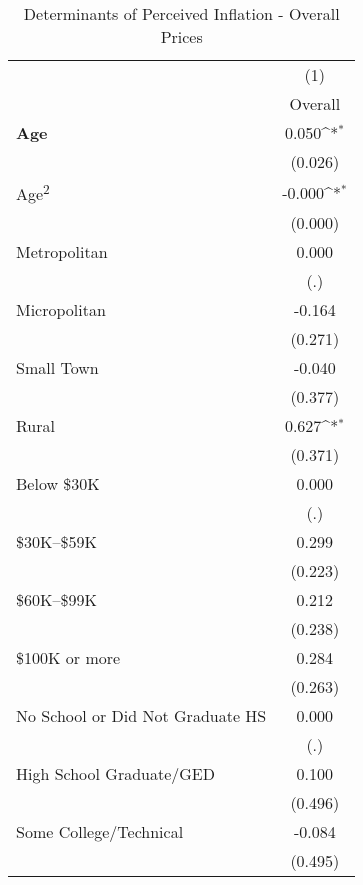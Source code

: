 \begin{table}[htbp]\centering
\def\sym#1{\ifmmode^{#1}\else\(^{#1}\)\fi}
\caption{Determinants of Perceived Inflation - Overall Prices}
\begin{tabular}{l*{1}{c}}
\hline\hline
                    &\multicolumn{1}{c}{(1)}\\
                    &\multicolumn{1}{c}{Overall}\\
\hline
\textbf{Age}        &       0.050\sym{*}  \\
                    &     (0.026)         \\
Age\textsuperscript{2}&      -0.000\sym{*}  \\
                    &     (0.000)         \\
Metropolitan        &       0.000         \\
                    &         (.)         \\
Micropolitan        &      -0.164         \\
                    &     (0.271)         \\
Small Town          &      -0.040         \\
                    &     (0.377)         \\
Rural               &       0.627\sym{*}  \\
                    &     (0.371)         \\
Below \$30K         &       0.000         \\
                    &         (.)         \\
\$30K--\$59K        &       0.299         \\
                    &     (0.223)         \\
\$60K--\$99K        &       0.212         \\
                    &     (0.238)         \\
\$100K or more      &       0.284         \\
                    &     (0.263)         \\
No School or Did Not Graduate HS&       0.000         \\
                    &         (.)         \\
High School Graduate/GED&       0.100         \\
                    &     (0.496)         \\
Some College/Technical&      -0.084         \\
                    &     (0.495)         \\

\end{tabular}
\end{table}
